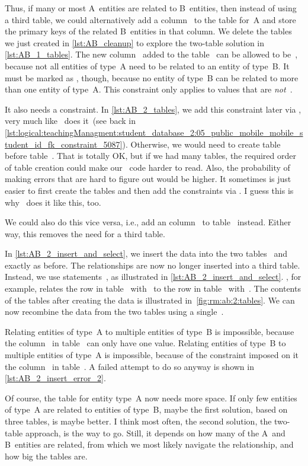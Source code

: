 Thus, if many or most A~entities are related to B~entities, then instead of using a third table, we could alternatively add a column~ to the table for~A and store the primary keys of the related B~entities in that column.
We delete the tables we just created in \cref{lst:AB_cleanup} to explore the two-table solution in \cref{lst:AB_1_tables}.
The new column~ added to the table~ can be allowed to be~, because not all entities of type~A need to be related to an entity of type~B.
It must be marked as , though, because no entity of type~B can be related to more than one entity of type~A.
This constraint only applies to values that are \emph{not}~.

It also needs a  constraint.
In \cref{lst:AB_2_tables}, we add this constraint later via , very much like \pgmodeler\ does it~(see back in \cref{lst:logical:teachingManagment:student_database_2:05_public_mobile_mobile_student_id_fk_constraint_5087}).
Otherwise, we would need to create table~ before table~.
That is totally OK, but if we had many tables, the required order of table creation could make our \sql\ code harder to read.
Also, the probability of making errors that are hard to figure out would be higher.
It sometimes is just easier to first create the tables and then add the constraints via .
I guess this is why \pgmodeler\ does it like this, too.

We could also do this vice versa, i.e., add an column~ to table~ instead.
Either way, this removes the need for a third table.

In \cref{lst:AB_2_insert_and_select}, we insert the data into the two tables~ and~ exactly as before.
The relationships are now no longer inserted into a third table.
Instead, we use  statements~\cite{PGDG:PD:U}, as illustrated in \cref{lst:AB_2_insert_and_select}.
, for example, relates the row in table~ with~ to the row in table~ with~.
The contents of the tables after creating the data is illustrated in~\cref{fig:rm:ab:2:tables}.
We can now recombine the data from the two tables using a single~.

Relating entities of type~A to multiple entities of type~B is impossible, because the column~ in table~ can only have one value.
Relating entities of type~B to multiple entities of type~A is impossible, because of the  constraint imposed on it the column~ in table~.
A failed attempt to do so anyway is shown in \cref{lst:AB_2_insert_error_2}.

Of course, the table for entity type~A now needs more space.
If only few entities of type~A are related to entities of type~B, maybe the first solution, based on three tables, is maybe better.
I think most often, the second solution, the two-table approach, is the way to go.
Still, it depends on how many of the A~and B~entities are related, from which  we most likely navigate the relationship, and how big the tables are.%
%
\FloatBarrier%
\endhsection%
